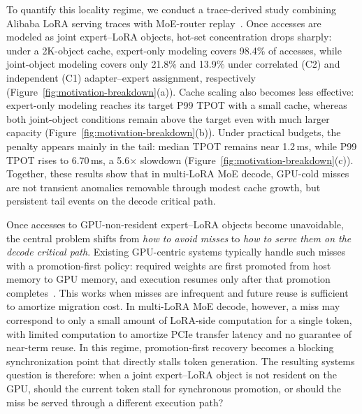 \documentclass[sigplan,anonymous,review,10pt]{acmart}
\begin{document}
To quantify this locality regime, we conduct a trace-derived study combining Alibaba LoRA serving traces with MoE-router replay~\cite{yan2026FlexPipe,gentd26}. Once accesses are modeled as joint expert--LoRA objects, hot-set concentration drops sharply: under a 2K-object cache, expert-only modeling covers 98.4\% of accesses, while joint-object modeling covers only 21.8\% and 13.9\% under correlated (C2) and independent (C1) adapter--expert assignment, respectively (Figure~\ref{fig:motivation-breakdown}(a)). Cache scaling also becomes less effective: expert-only modeling reaches its target P99 TPOT with a small cache, whereas both joint-object conditions remain above the target even with much larger capacity (Figure~\ref{fig:motivation-breakdown}(b)). Under practical budgets, the penalty appears mainly in the tail: median TPOT remains near 1.2\,ms, while P99 TPOT rises to 6.70\,ms, a 5.6$\times$ slowdown (Figure~\ref{fig:motivation-breakdown}(c)). Together, these results show that in multi-LoRA MoE decode, GPU-cold misses are not transient anomalies removable through modest cache growth, but persistent tail events on the decode critical path.

Once accesses to GPU-non-resident expert--LoRA objects become unavoidable, the central problem shifts from \emph{how to avoid misses} to \emph{how to serve them on the decode critical path}. Existing GPU-centric systems typically handle such misses with a promotion-first policy: required weights are first promoted from host memory to GPU memory, and execution resumes only after that promotion completes~\cite{sheng2023flexgen}. This works when misses are infrequent and future reuse is sufficient to amortize migration cost. In multi-LoRA MoE decode, however, a miss may correspond to only a small amount of LoRA-side computation for a single token, with limited computation to amortize PCIe transfer latency and no guarantee of near-term reuse. In this regime, promotion-first recovery becomes a blocking synchronization point that directly stalls token generation. The resulting systems question is therefore: when a joint expert--LoRA object is not resident on the GPU, should the current token stall for synchronous promotion, or should the miss be served through a different execution path?
\end{document}
